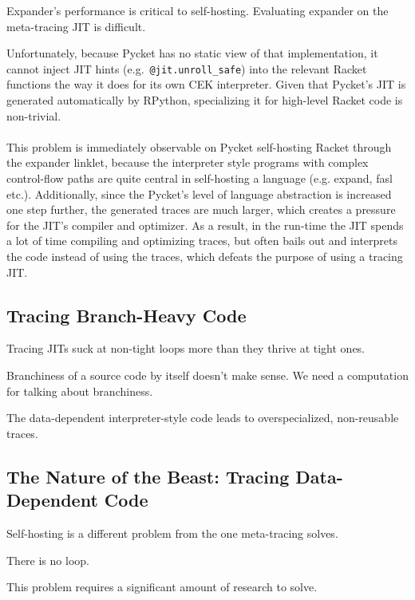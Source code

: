 		\begin{sectionpoint}
			Expander's performance is critical to self-hosting. Evaluating expander on the meta-tracing JIT is difficult.
		\end{sectionpoint}

		 Unfortunately, because Pycket has no static view of that implementation, it cannot inject JIT hints (e.g.\ \verb|@jit.unroll_safe|) into the relevant Racket functions the way it does for its own CEK interpreter.  Given that Pycket’s JIT is generated automatically by RPython, specializing it for high-level Racket code is non-trivial.

		\paragraph{}%
			This problem is immediately observable on Pycket self-hosting Racket
		through the expander linklet, because the interpreter style programs
		with complex control-flow paths are quite central in self-hosting a
		language (e.g. expand, fasl etc.). Additionally, since the Pycket's
		level of language abstraction is increased one step further, the
		generated traces are much larger, which creates a pressure for the
		JIT's compiler and optimizer. As a result, in the run-time the JIT
		spends a lot of time compiling and optimizing traces, but often bails
		out and interprets the code instead of using the traces, which defeats
		the purpose of using a tracing JIT.

		\subsection{Tracing Branch-Heavy Code}
			\begin{mainpoint}
		 	Tracing JITs suck at non-tight loops more than they thrive at tight ones.

			Branchiness of a source code by itself doesn't make sense. We need a computation for talking about branchiness.

			The data-dependent interpreter-style code leads to overspecialized, non-reusable traces.
		\end{mainpoint}
			\label{section:branchy}


		\subsection{The Nature of the Beast: Tracing Data-Dependent Code}

			\begin{sectionpoint}
				\begin{mainpoint}
					Self-hosting is a different problem from the one meta-tracing solves.

					There is no loop.

					This problem requires a significant amount of research to solve.
				\end{mainpoint}

			\end{sectionpoint}


